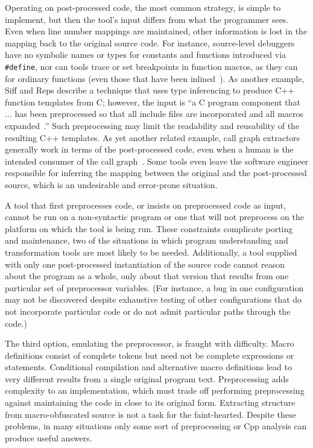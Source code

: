 \documentclass[11pt]{article}
\begin{document}
Operating on post-processed code, the most common strategy, is simple to
implement, but then the tool's input differs from what the
programmer sees.  Even when line number mappings are maintained, other
information is lost in the mapping back to the original source code.
For instance, source-level debuggers have no symbolic names or types
for constants and functions introduced via {\tt \#define}, nor can tools
trace or set breakpoints in function macros, as they can for ordinary
functions (even those that have been inlined~\cite{Zellweger83:TR}).
As another example, Siff
and Reps describe a technique that uses type inferencing to produce
C++ function templates from C; however, the input is ``a C program
component that $\ldots$ has been preprocessed so that all include
files are incorporated and all macros
expanded~\cite[p.~145]{Siff-fse96}.''  Such preprocessing may limit
the readability and reusability of the resulting C++ templates.  As
yet another related example, call graph extractors generally work in
terms of the post-processed code, even when a human is the intended
consumer of the call graph~\cite{Murphy-icse18}.  Some tools even
leave the software engineer responsible for inferring the mapping between the
original and the post-processed source, which is an undesirable and
error-prone situation.

A tool that first preprocesses code, or insists on preprocessed code as
input, cannot be run on a non-syntactic program or one that will not
preprocess on the platform on which the tool is being run.  These
constraints complicate porting and maintenance, two of the situations in
which program understanding and transformation tools are most likely to be
needed.  Additionally, a tool supplied with only one post-processed
instantiation of the source code cannot reason about the program as a
whole, only about that version that results from one particular set of
preprocessor variables.  (For instance, a bug in one configuration may not
be discovered despite exhaustive testing of other configurations that do
not incorporate particular code or do not admit particular paths through
the code.)

The third option, emulating the preprocessor, is fraught with difficulty.
Macro definitions consist of complete tokens but need not be complete
expressions or statements.  Conditional compilation and alternative macro
definitions lead to very different results from a single original program
text.  Preprocessing adds complexity to an implementation, which must trade
off performing preprocessing against maintaining the code in close to its
original form.  Extracting structure from macro-obfuscated source is not a
task for the faint-hearted.  Despite these problems, in many situations
only some sort of preprocessing or Cpp analysis can produce useful answers.
\end{document}
